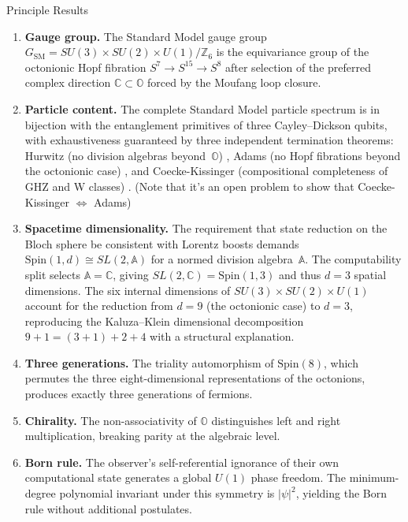 \documentclass[final]{beamer}
\newlength{\colwidth}
\begin{document}
\begin{frame}[t]
\begin{columns}[t]
\begin{column}{\colwidth}
\begin{block}{Principle Results}
\begin{enumerate}
  \item \textbf{Gauge group.} The Standard Model gauge group $G_{\mathrm{SM}} = SU(3) \times SU(2) \times U(1)/\mathbb{Z}_6$ is the equivariance group of the octonionic Hopf fibration $S^7 \to S^{15} \to S^8$ after selection of the preferred complex direction $\mathbb{C} \subset \mathbb{O}$ forced by the Moufang loop closure.

  \item \textbf{Particle content.} The complete Standard Model particle spectrum is in bijection with the entanglement primitives of three Cayley--Dickson qubits, with exhaustiveness guaranteed by three independent termination theorems: Hurwitz (no division algebras beyond~$\mathbb{O}$) \autocite{hurwitz_1898}, Adams (no Hopf fibrations beyond the octonionic case) \autocite{adams_1960}, and Coecke-Kissinger (compositional completeness of GHZ and W classes) \autocite{Coecke2010TheEntanglement}. (Note that it's an open problem to show that Coecke-Kissinger $\iff$ Adams) 

  \item \textbf{Spacetime dimensionality.} The requirement that state reduction on the Bloch sphere be consistent with Lorentz boosts demands $\mathrm{Spin}(1,d) \cong SL(2,\mathbb{A})$ for a normed division algebra~$\mathbb{A}$. The computability split selects $\mathbb{A} = \mathbb{C}$, giving $SL(2,\mathbb{C}) = \mathrm{Spin}(1,3)$ and thus $d = 3$ spatial dimensions. The six internal dimensions of $SU(3) \times SU(2) \times U(1)$ account for the reduction from $d = 9$ (the octonionic case) to $d = 3$, reproducing the Kaluza--Klein dimensional decomposition $9+1 = (3+1) + 2 + 4$ with a structural explanation.

  \item \textbf{Three generations.} The triality automorphism of $\mathrm{Spin}(8)$, which permutes the three eight-dimensional representations of the octonions, produces exactly three generations of fermions.

  \item \textbf{Chirality.} The non-associativity of $\mathbb{O}$ distinguishes left and right multiplication, breaking parity at the algebraic level.

  \item \textbf{Born rule.} The observer's self-referential ignorance of their own computational state generates a global $U(1)$ phase freedom. The minimum-degree polynomial invariant under this symmetry is $|\psi|^2$, yielding the Born rule without additional postulates.


\end{enumerate}
\end{block}
\end{column}
\end{columns}
\end{frame}
\end{document}
